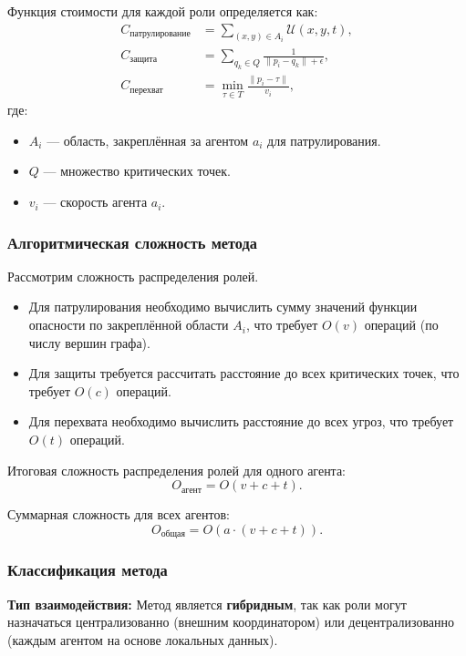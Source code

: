 Функция стоимости для каждой роли определяется как:
\begin{align}
	C_{\text{патрулирование}} &= \sum_{(x, y) \in A_i} \mathcal{U}(x, y, t), \\
	C_{\text{защита}} &= \sum_{q_k \in Q} \frac{1}{\|p_i - q_k\| + \epsilon}, \\
	C_{\text{перехват}} &= \min_{\tau \in T} \frac{\|p_i - \tau\|}{v_i},
\end{align}
где:
\begin{itemize}
	\item $A_i$ — область, закреплённая за агентом $a_i$ для патрулирования.
	\item $Q$ — множество критических точек.
	\item $v_i$ — скорость агента $a_i$.
\end{itemize}

\subsubsection*{Алгоритмическая сложность метода}
Рассмотрим сложность распределения ролей.  
\begin{itemize}
	\item Для патрулирования необходимо вычислить сумму значений функции опасности по закреплённой области $A_i$, что требует $O(v)$ операций (по числу вершин графа).
	\item Для защиты требуется рассчитать расстояние до всех критических точек, что требует $O(c)$ операций.
	\item Для перехвата необходимо вычислить расстояние до всех угроз, что требует $O(t)$ операций.
\end{itemize}

Итоговая сложность распределения ролей для одного агента:
\begin{equation}
	O_{\text{агент}} = O(v + c + t).
\end{equation}

Суммарная сложность для всех агентов:
\begin{equation}
	O_{\text{общая}} = O(a \cdot (v + c + t)).
\end{equation}

\subsubsection*{Классификация метода}
\textbf{Тип взаимодействия:}  
Метод является \textbf{гибридным}, так как роли могут назначаться централизованно (внешним координатором) или децентрализованно (каждым агентом на основе локальных данных).

